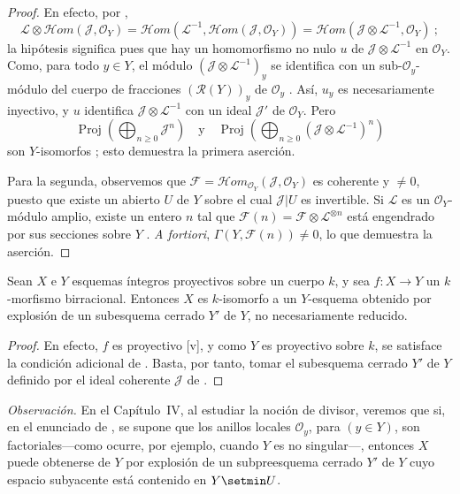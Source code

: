 \begin{proof}
En efecto, por ,
\[
\mathcal L\otimes\mathcal{H}om(\mathcal J,\mathcal O_Y)
=\mathcal{H}om(\mathcal L^{-1},\mathcal{H}om(\mathcal J,\mathcal O_Y))
=\mathcal{H}om(\mathcal J\otimes\mathcal L^{-1},\mathcal O_Y)~;
\]
la hipótesis significa pues que hay un homomorfismo no nulo $u$ de
$\mathcal J\otimes\mathcal L^{-1}$ en $\mathcal O_Y$. Como, para todo
$y\in Y$, el módulo $(\mathcal J\otimes\mathcal L^{-1})_y$ se identifica con un sub-$\mathcal O_y$-módulo del cuerpo de fracciones $(\mathcal R(Y))_y$ de $\mathcal O_y$ .
Así, $u_y$ es necesariamente inyectivo, y $u$ identifica $\mathcal J\otimes\mathcal L^{-1}$ con un ideal $\mathcal J'$ de $\mathcal O_Y$.
Pero
\[
\operatorname{Proj}\left(\bigoplus_{n\geq0}\mathcal J^n\right)
\quad\text{y}\quad
\operatorname{Proj}\left(
\bigoplus_{n\geq0}(\mathcal J\otimes\mathcal L^{-1})^n\right)
\]
son $Y$-isomorfos ; esto demuestra la primera aserción.

Para la segunda, observemos que
$\mathcal F=\mathcal{H}om_{\mathcal O_Y}(\mathcal J,\mathcal O_Y)$ es
coherente y $\neq0$, puesto que existe un abierto $U$ de $Y$ sobre el cual $\mathcal J|U$ es invertible.
Si $\mathcal L$ es un $\mathcal O_Y$-módulo amplio, existe un entero $n$ tal que
$\mathcal F(n)=\mathcal F\otimes\mathcal L^{\otimes n}$
está engendrado por sus secciones sobre $Y$ .
\emph{A fortiori},
$\Gamma(Y,\mathcal F(n))\neq0$,
lo que demuestra la aserción.
\end{proof}

\begin{corollary}[2.3.7]
\label{III.2.3.7}
\label{III.2.3.7-fr}
Sean $X$ e $Y$ esquemas íntegros proyectivos sobre un cuerpo $k$, y sea
$f:X\to Y$
un $k$-morfismo birracional.
Entonces $X$ es $k$-isomorfo a un $Y$-esquema obtenido por explosión de un subesquema cerrado $Y'$ de $Y$, no necesariamente reducido.
\end{corollary}

\begin{proof}
En efecto, $f$ es proyectivo [v], y como $Y$ es proyectivo sobre $k$, se satisface la condición adicional de .
Basta, por tanto, tomar el subesquema cerrado $Y'$ de $Y$ definido por el ideal coherente $\mathcal J$ de .
\end{proof}

\begin{env}[2.3.8]
\label{III.2.3.8}
\label{III.2.3.8-fr}
\emph{Observación.}
En el Capítulo~IV, al estudiar la noción de divisor, veremos que si, en el enunciado de , se supone que los anillos locales $\mathcal O_y$, para $(y\in Y)$, son factoriales---como ocurre, por ejemplo, cuando $Y$ es no singular---, entonces $X$ puede obtenerse de $Y$ por explosión de un subpreesquema cerrado $Y'$ de $Y$ cuyo espacio subyacente está contenido en $Y\setmin U$.
\end{env}


